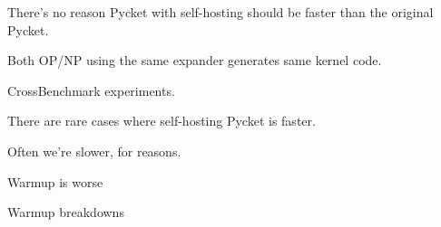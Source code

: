 		\begin{paragraph-here}
			There’s no reason Pycket with self-hosting should be faster than the original Pycket.

			Both OP/NP using the same expander generates same kernel code.
		\end{paragraph-here}

		\begin{show-experiment}
			CrossBenchmark experiments.
		\end{show-experiment}

		\begin{paragraph-here}
			There are rare cases where self-hosting Pycket is faster.
		\end{paragraph-here}

		\begin{paragraph-here}
			 Often we're slower, for reasons.
		\end{paragraph-here}

		\begin{paragraph-here}
			Warmup is worse
		\end{paragraph-here}

		\begin{show-experiment}
			Warmup breakdowns
		\end{show-experiment}




